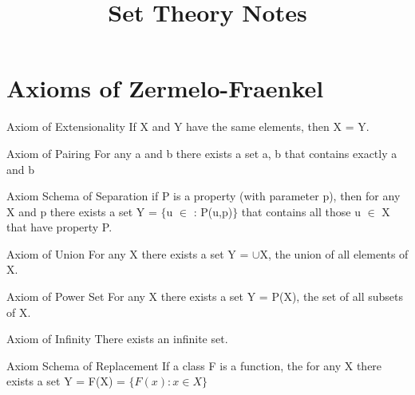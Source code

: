 \documentclass[10pt,a4paper]{article}
\title{Set Theory Notes}
\begin{document}
\maketitle
\tableofcontents
\newpage

\section{Axioms of Zermelo-Fraenkel}
\begin{axiom}{Axiom of Extensionality}
	If X and Y have the same elements, then X = Y.
\end{axiom}

\begin{axiom}{Axiom of Pairing}
	For any a and b there exists a set {a, b} that contains exactly a and b
\end{axiom}

\begin{axiom}{Axiom Schema of Separation}
	if P is a property (with parameter p), then for any X and p there exists a set Y = $\lbrace$u $\in$ : P(u,p)$\rbrace$ that contains all those u $\in$ X that have property P.
\end{axiom}

\begin{axiom}{Axiom of Union}
	For any X there exists a set Y = $\cup$X, the union of all elements of X.
\end{axiom}

\begin{axiom}{Axiom of Power Set}
	For any X there exists a set Y = P(X), the set of all subsets of X.
\end{axiom}

\begin{axiom}{Axiom of Infinity}
	There exists an infinite set.
\end{axiom}

\begin{axiom}{Axiom Schema of Replacement}
	If a class F is a function, the for any X there exists a set Y = F(X) = $\lbrace F(x) : x \in X \rbrace$
\end{axiom}
\end{document}
